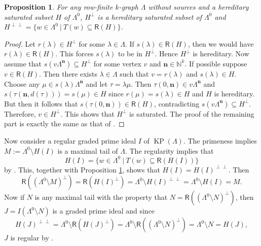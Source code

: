 \documentclass[a4paper,reqno,12pt]{amsart}
\numberwithin{equation}{section}
\newtheorem{prop}[thm]{Proposition}
\theoremstyle{definition}
\theoremstyle{remark}
\newcommand{\KP}{\operatorname{KP}}
\newcommand{\N}{\mathbf{n}}
\begin{document}
\begin{prop}\label{pro reachability and double perp}
For any row-finite $k$-graph $\Lambda$ without sources and a hereditary saturated subset $H$ of $\Lambda^0$, $H^\perp$ is a hereditary saturated subset of $\Lambda^0$ and $H^{\perp\perp}=\{w\in \Lambda^0~|~T(w)\subseteq \mathsf{R}(H)\}$.  
\end{prop}
\begin{proof}
Let $r(\lambda)\in H^\perp$ for some $\lambda\in \Lambda$. If $s(\lambda)\in \mathsf{R}(H)$, then we would have $r(\lambda)\in \mathsf{R}(H)$. This forces $s(\lambda)$ to be in $H^\perp$. Hence $H^\perp$ is hereditary. Now assume that $s(v\Lambda^\N)\subseteq H^\perp$ for some vertex $v$ and $\N\in \mathbb{N}^k$. If possible suppose $v\in \mathsf{R}(H)$. Then there exists $\lambda\in \Lambda$ such that $v=r(\lambda)$ and $s(\lambda)\in H$. Choose any $\mu\in s(\lambda)\Lambda^\N$ and let $\tau=\lambda\mu$. Then $\tau(0,\N)\in v\Lambda^\N$ and $s(\tau(\N,d(\tau)))=s(\mu)\in H$ since $r(\mu)=s(\lambda)\in H$ and $H$ is hereditary. But then it follows that $s(\tau(0,\N))\in \mathsf{R}(H)$, contradicting $s(v\Lambda^\N)\subseteq H^\perp$. Therefore, $v\in H^\perp$. This shows that $H^\perp$ is saturated. The proof of the remaining part is exactly the same as that of \cite[Proposition 3.12]{CGHaz}.
\end{proof}
Now consider a regular graded prime ideal $I$ of $\KP(\Lambda)$. The primeness implies $M:=\Lambda^0\setminus H(I)$ is a maximal tail of $\Lambda$. The regularity implies that \[H(I)=\{w\in \Lambda^0~|~T(w)\subseteq \mathsf{R}(H(I))\}\] by \cite[Theorem 4.6(iii)]{Schenkel}. This, together with Proposition \ref{pro reachability and double perp}, shows that $H(I)=H(I)^{\perp\perp}$. Then \[\mathsf{R}\left((\Lambda^0\setminus M)^\perp\right)=\mathsf{R}(H(I)^\perp)=\Lambda^0\setminus H(I)^{\perp\perp}=\Lambda^0\setminus H(I)=M.\] Now if $N$ is any maximal tail with the property that $N=\mathsf{R}\left((\Lambda^0\setminus N)^\perp\right)$, then $J=I(\Lambda^0\setminus N)$ is a graded prime ideal and since \[H(J)^{\perp\perp}=\Lambda^0\setminus \mathsf{R}\left(H(J)^\perp\right)=\Lambda^0\setminus \mathsf{R}\left((\Lambda^0\setminus N)^\perp\right)=\Lambda^0\setminus N=H(J),\] $J$ is regular by \cite[Theorem 4.6(iii)]{Schenkel}.
\end{document}
